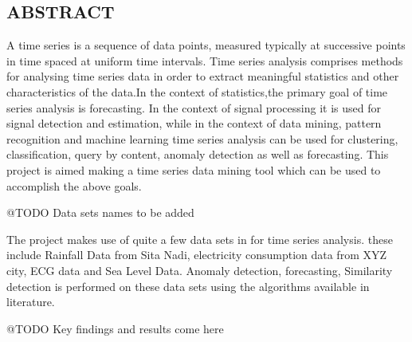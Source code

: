 \documentclass[12pt]{report}
\begin{document}
\newpage

\begin{center}
\section*{ABSTRACT}
\end{center} 
A time series is a sequence of data points, measured typically at successive points in time spaced at uniform time intervals. Time series analysis comprises methods for analysing time series data in order to extract meaningful statistics and other characteristics of the data.In the context of statistics,the primary goal of time series analysis is forecasting. In the context of signal processing it is used for signal detection and estimation, while in the context of data mining, pattern recognition and machine learning time series analysis can be used for clustering, classification, query by content, anomaly detection as well as forecasting. This project is aimed making a time series data mining tool which can be used to accomplish the above goals. 

@TODO Data sets names to be added 

The project makes use of quite a few data sets in for time series analysis. these include Rainfall Data from Sita Nadi, electricity consumption data from XYZ city, ECG data and Sea Level Data. Anomaly detection, forecasting, Similarity detection is performed on these data sets using the algorithms available in literature. 

@TODO Key findings and results come here




\tableofcontents

\newpage
{}
\listoffigures

\newpage
{}
\listoftables


\newpage


\pagestyle{fancy}
\chead{}
\rfoot{\small{\thepage}}
\renewcommand{\headrulewidth}{0.4pt}
\renewcommand{\footrulewidth}{0.4pt}
\end{document}

